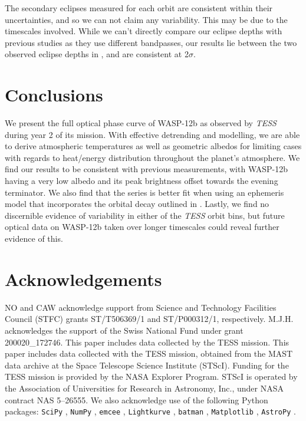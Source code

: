 \documentclass[fleqn,usenatbib]{mnras}
\begin{document}
The secondary eclipses measured for each orbit are consistent within their uncertainties, and so we can not claim any variability. This may be due to the timescales involved. While we can't directly compare our eclipse depths with previous studies as they use different bandpasses, our results lie between the two observed eclipse depths in \citet{hooton}, and are consistent at 2$\sigma$.

\section{Conclusions}\label{conclusion}
We present the full optical phase curve of WASP-12b as observed by \textit{TESS} during year 2 of its mission. With effective detrending and modelling, we are able to derive atmospheric temperatures as well as geometric albedos for limiting cases with regards to heat/energy distribution throughout the planet's atmosphere. We find our results to be consistent with previous measurements, with WASP-12b having a very low albedo and its peak brightness offset towards the evening terminator. We also find that the series is better fit when using an ephemeris model that incorporates the orbital decay outlined in \citet{orbitdecay}. Lastly, we find no discernible evidence of variability in either of the \textit{TESS} orbit bins, but future optical data on WASP-12b taken over longer timescales could reveal further evidence of this.

\section*{Acknowledgements}
 NO and CAW acknowledge support from Science and Technology Facilities Council (STFC) grants ST/T506369/1 and ST/P000312/1, respectively. M.J.H. acknowledges the support of the Swiss National Fund under grant 200020\_172746. This paper includes data collected by the TESS mission. This paper includes data collected with the TESS mission, obtained from the MAST data archive at the Space Telescope Science Institute (STScI). Funding for the TESS mission is provided by the NASA Explorer Program. STScI is operated by the Association of Universities for Research in Astronomy, Inc., under NASA contract NAS 5–26555. We also acknowledge use of the following Python packages: \texttt{SciPy} \citep{scipy}, \texttt{NumPy} \citep{numpy}, \texttt{emcee} \citep{emcee}, \texttt{Lightkurve} \citep{lightkurve}, \texttt{batman} \citep{batman}, \texttt{Matplotlib} \citep{matplotlib}, \texttt{AstroPy} \citep{astropy}.
 
\end{document}
